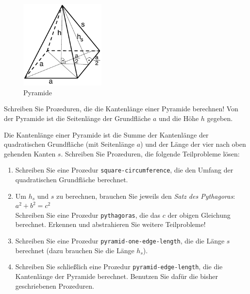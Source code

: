 
\begin{figure}
  \begin{center}
    \includegraphics[width=0.38\textwidth]{pyramid_fig}
  \end{center}
  \caption{Pyramide}
\end{figure}

  
 Schreiben Sie Prozeduren, die die Kantenlänge einer
  Pyramide berechnen!  Von der Pyramide ist die Seitenlänge der
  Grundfläche $a$ und die Höhe $h$ gegeben.

  Die Kantenlänge einer Pyramide ist die Summe der Kantenlänge der
  quadratischen Grundfläche (mit Seitenlänge $a$) und der Länge der
  vier nach oben gehenden Kanten $s$.  Schreiben Sie Prozeduren, die
  folgende Teilprobleme lösen:



  \begin{enumerate}
  \item Schreiben Sie eine Prozedur \texttt{square-circumference}, die
    den Umfang der quadratischen Grundfl\"ache berechnet.

 \item Um $h_s$ und $s$ zu berechnen, brauchen Sie jeweils den
    \textit{Satz des Pythagoras}: $ a^2 + b^2 = c^2$\\
    Schreiben Sie eine Prozedur \texttt{pythagoras}, die das $c$ der
    obigen Gleichung berechnet.  Erkennen und abstrahieren Sie weitere
    Teilprobleme!

  \item Schreiben Sie eine Prozedur \texttt{pyramid-one-edge-length}, die
    die Länge $s$ berechnet (dazu brauchen Sie die Länge $h_s$).

  \item Schreiben Sie schließlich eine Prozedur
    \texttt{pyramid-edge-length}, die die Kantenlänge der Pyramide
    berechnet.  Benutzen Sie dafür die bisher geschriebenen
    Prozeduren. 
  \end{enumerate}

